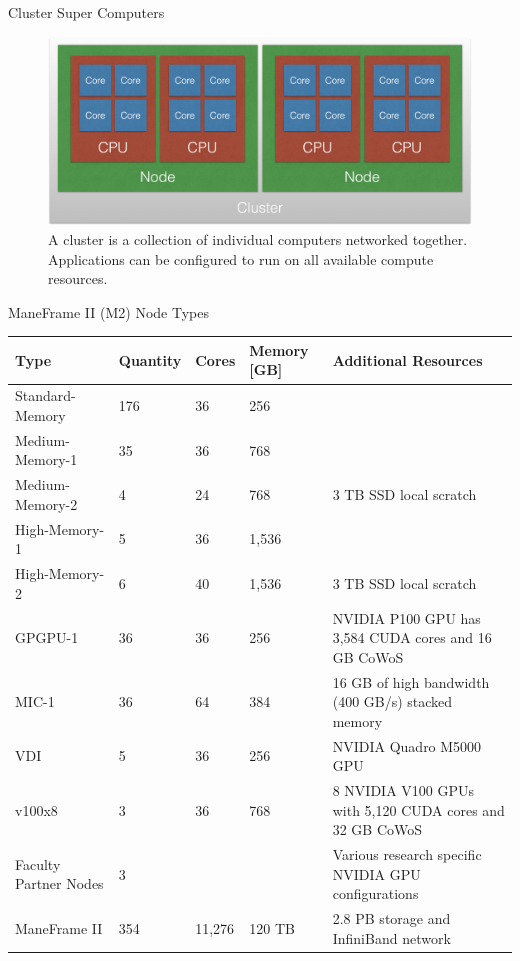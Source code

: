 \begin{frame}{Cluster Super Computers}
\begin{figure}
  \centering
  \includegraphics[width=0.75\linewidth]{figures/cluster.png}
  \caption{A cluster is a collection of individual computers networked together. Applications can be configured to run on all available compute resources.}
\end{figure}
\end{frame}

\begin{frame}{ManeFrame II (M2) Node Types}
\begin{table}
\tiny
\begin{tabular}{lllll}
\toprule
Type & Quantity & Cores & Memory [GB] & Additional Resources\\
\midrule
Standard-Memory & 176 & 36 & 256 & \\
Medium-Memory-1 & 35 & 36 & 768 & \\
Medium-Memory-2 & 4 & 24 & 768 & 3 TB SSD local scratch\\
High-Memory-1 & 5 & 36 & 1,536 & \\
High-Memory-2 & 6 & 40 & 1,536 & 3 TB SSD local scratch\\
GPGPU-1 & 36 & 36 & 256 & NVIDIA P100 GPU has 3,584 CUDA cores and 16 GB CoWoS\\
MIC-1 & 36 & 64 & 384 & 16 GB of high bandwidth (400 GB/s) stacked memory\\
VDI & 5 & 36 & 256 & NVIDIA Quadro M5000 GPU\\
v100x8 & 3 & 36 & 768 & 8 NVIDIA V100 GPUs with 5,120 CUDA cores and 32 GB CoWoS\\
Faculty Partner Nodes & 3 &  &  & Various research specific NVIDIA GPU configurations\\
\midrule
ManeFrame II & 354 & 11,276 & 120 TB & 2.8 PB storage and InfiniBand network\\
\bottomrule
\end{tabular}
\end{table}
\end{frame}

